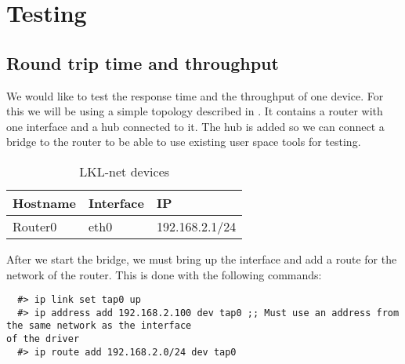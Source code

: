 \chapter{Testing}

\section{Round trip time and throughput}
\label{sec:response-time}


We would like to test the response time and the throughput of one device. For this we will be using
a simple topology described in . It contains a router with one interface and
a hub connected to it. The hub is added so we can connect a bridge to the router to be able to use
existing user space tools for testing.


\begin{center}
  \begin{table}[htb]
  \begin{center}
  \begin{tabular}{| l | l | l |}
    \hline
      Hostname & Interface & IP  \\ \hline
      Router0 & eth0 & 192.168.2.1/24 \\ 
    \hline
  \end{tabular}
  \end{center}
  \caption{LKL-net devices}
  \label{table:tdevices}
  \end{table}
\end{center}

After we start the bridge, we must bring up the interface and add a route for the network of the
router. This is done with the following commands:

\lstset{language=zsh,caption=Configuring a TAP interface,label=lst:conf-tap}
\begin{lstlisting}
  #> ip link set tap0 up
  #> ip address add 192.168.2.100 dev tap0 ;; Must use an address from the same network as the interface
of the driver
  #> ip route add 192.168.2.0/24 dev tap0
\end{lstlisting}

